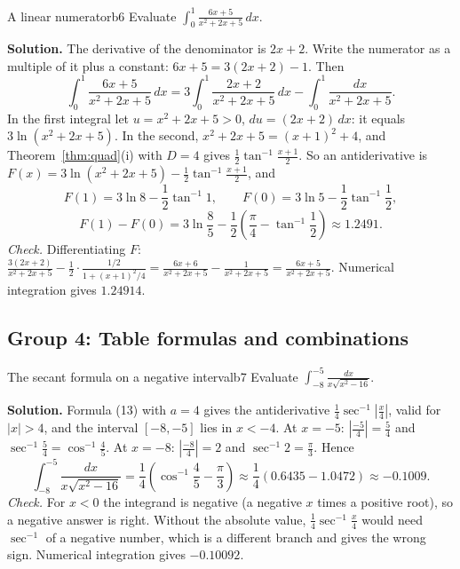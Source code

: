 \documentclass[11pt]{article}
\begin{document}
\begin{exmp}{A linear numerator}{b6}
Evaluate $\int_0^1\frac{6x+5}{x^2+2x+5}\,dx$.

\textbf{Solution.} The derivative of the denominator is $2x+2$. Write the numerator as a multiple of it plus a constant: $6x+5=3(2x+2)-1$. Then
\[\int_0^1\frac{6x+5}{x^2+2x+5}\,dx=3\int_0^1\frac{2x+2}{x^2+2x+5}\,dx-\int_0^1\frac{dx}{x^2+2x+5}.\]
In the first integral let $u=x^2+2x+5>0$, $du=(2x+2)\,dx$: it equals $3\ln(x^2+2x+5)$. In the second, $x^2+2x+5=(x+1)^2+4$, and Theorem~\ref{thm:quad}(i) with $D=4$ gives $\frac12\tan^{-1}\frac{x+1}2$. So an antiderivative is $F(x)=3\ln(x^2+2x+5)-\frac12\tan^{-1}\frac{x+1}2$, and
\[F(1)=3\ln8-\frac12\tan^{-1}1,\qquad F(0)=3\ln5-\frac12\tan^{-1}\frac12,\]
\[F(1)-F(0)=3\ln\frac85-\frac12\left(\frac\pi4-\tan^{-1}\frac12\right)\approx1.2491 .\]
\emph{Check.} Differentiating $F$: $\frac{3(2x+2)}{x^2+2x+5}-\frac12\cdot\frac{1/2}{1+(x+1)^2/4}=\frac{6x+6}{x^2+2x+5}-\frac{1}{x^2+2x+5}=\frac{6x+5}{x^2+2x+5}$. Numerical integration gives $1.24914$.
\end{exmp}

\subsection*{Group 4: Table formulas and combinations}

\begin{exmp}{The secant formula on a negative interval}{b7}
Evaluate $\int_{-8}^{-5}\frac{dx}{x\sqrt{x^2-16}}$.

\textbf{Solution.} Formula (13) with $a=4$ gives the antiderivative $\frac14\sec^{-1}\left\lvert\frac x4\right\rvert$, valid for $\lvert x\rvert>4$, and the interval $[-8,-5]$ lies in $x<-4$. At $x=-5$: $\left\lvert\frac{-5}4\right\rvert=\frac54$ and $\sec^{-1}\frac54=\cos^{-1}\frac45$. At $x=-8$: $\left\lvert\frac{-8}4\right\rvert=2$ and $\sec^{-1}2=\frac\pi3$. Hence
\[\int_{-8}^{-5}\frac{dx}{x\sqrt{x^2-16}}=\frac14\left(\cos^{-1}\frac45-\frac\pi3\right)\approx\frac14(0.6435-1.0472)\approx-0.1009 .\]
\emph{Check.} For $x<0$ the integrand is negative (a negative $x$ times a positive root), so a negative answer is right. Without the absolute value, $\frac14\sec^{-1}\frac x4$ would need $\sec^{-1}$ of a negative number, which is a different branch and gives the wrong sign. Numerical integration gives $-0.10092$.
\end{exmp}
\end{document}
